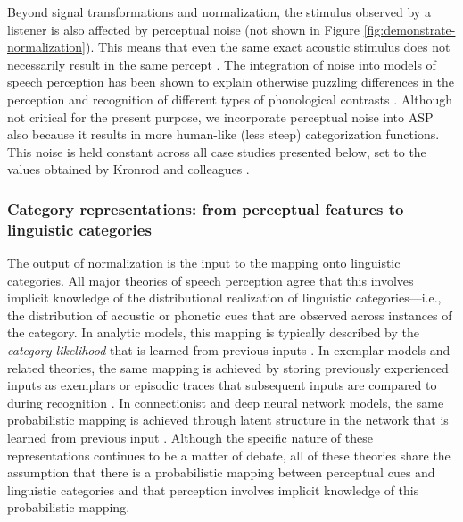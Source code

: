 \documentclass[
  11pt,
  man,floatsintext]{apa6}
\begin{document}
Beyond signal transformations and normalization, the stimulus observed by a listener is also affected by perceptual noise (not shown in Figure \ref{fig:demonstrate-normalization}). This means that even the same exact acoustic stimulus does not necessarily result in the same percept \autocites{leonard2016,schuerman2022,feldman2009}[p.~148]{nearey-hogan1986}. The integration of noise into models of speech perception has been shown to explain otherwise puzzling differences in the perception and recognition of different types of phonological contrasts \autocite[e.g.,][]{kronrod2016}. Although not critical for the present purpose, we incorporate perceptual noise into ASP also because it results in more human-like (less steep) categorization functions. This noise is held constant across all case studies presented below, set to the values obtained by Kronrod and colleagues \autocite*[\(\sigma^2_{noise, VOT}=80 msec^2\), \(\sigma^2_{noise, spectral}=878 Mel^2\)]{kronrod2016}.

\hypertarget{sec:representations}{%
\subsubsection{Category representations: from perceptual features to linguistic categories}\label{sec:representations}}

The output of normalization is the input to the mapping onto linguistic categories. All major theories of speech perception agree that this involves implicit knowledge of the distributional realization of linguistic categories---i.e., the distribution of acoustic or phonetic cues that are observed across instances of the category. In analytic models, this mapping is typically described by the \emph{category likelihood} that is learned from previous inputs \autocites[e.g., in the neighborhood activation model,][]{luce-pisoni1998}[shortlist B,][]{norris-mcqueen2008}[and other Bayesian inference models,][]{clayards2008,feldman2009,kleinschmidt-jaeger2015}. In exemplar models and related theories, the same mapping is achieved by storing previously experienced inputs as exemplars \autocites[e.g.,][]{johnson2006,pierrehumbert2001,wedel2006} or episodic traces \autocite{goldinger1996} that subsequent inputs are compared to during recognition \autocite[e.g., by means of \(k\)-nearest neighbor algorithms,][]{fix-hodges1989}. In connectionist and deep neural network models, the same probabilistic mapping is achieved through latent structure in the network that is learned from previous input \autocite{mcclelland-elman1986,magnuson2020}. Although the specific nature of these representations continues to be a matter of debate, all of these theories share the assumption that there is a probabilistic mapping between perceptual cues and linguistic categories \autocite[see also][ on the close computational relation between exemplar and Bayesian inference models]{shi2010} and that perception involves implicit knowledge of this probabilistic mapping.
\end{document}
